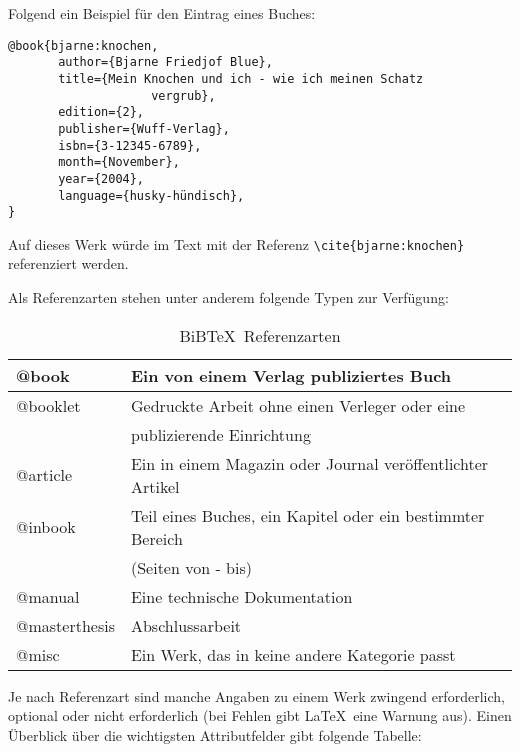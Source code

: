 Folgend ein Beispiel für den Eintrag eines Buches:

\begin{verbatim}
@book{bjarne:knochen,
       author={Bjarne Friedjof Blue},
       title={Mein Knochen und ich - wie ich meinen Schatz
       				vergrub},
       edition={2},
       publisher={Wuff-Verlag},
       isbn={3-12345-6789},
       month={November},
       year={2004},
       language={husky-hündisch},
}
\end{verbatim}

Auf dieses Werk würde im Text mit der Referenz \verb|\cite{bjarne:knochen}| referenziert
werden.

Als Referenzarten stehen unter anderem folgende Typen zur Verfügung:

\begin{table}[h]
	\centering
		\begin{tabular}[t]{|l|l|}
		\hline
		@book &Ein von einem Verlag publiziertes Buch\\
		\hline
		@booklet &Gedruckte Arbeit ohne einen Verleger oder eine\\
		 				&publizierende Einrichtung\\
		\hline
		@article &Ein in einem Magazin oder Journal veröffentlichter Artikel\\
		\hline
		@inbook &Teil eines Buches, ein Kapitel oder ein bestimmter Bereich\\
						&(Seiten von - bis)\\
		\hline
		@manual &Eine technische Dokumentation\\
		\hline
		@masterthesis &Abschlussarbeit\\
		\hline
		@misc &Ein Werk, das in keine andere Kategorie passt\\
		\hline
		\end{tabular}
	\caption{BiB\TeX \ Referenzarten}
	\label{tab:BiBTeXReferenzarten}
\end{table}

\newpage

Je nach Referenzart sind manche Angaben zu einem Werk zwingend erforderlich,
optional oder nicht erforderlich (bei Fehlen gibt \LaTeX \ eine Warnung aus).
Einen Überblick über die wichtigsten Attributfelder gibt folgende Tabelle:

